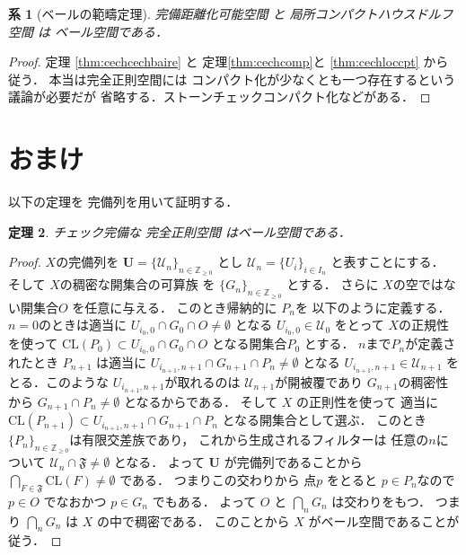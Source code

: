 \documentclass[leqno, a4paper, 12pt]{jsarticle}
\newtheorem{thm}{定理}
\newtheorem{cor}[thm]{系}
\newcommand{\zz}{\mathbb{Z}}
\newcommand{\cl}{\mathrm{CL}}
\begin{document}
\begin{cor}[ベールの範疇定理]
完備距離化可能空間
と
局所コンパクトハウスドルフ空間
は
ベール空間である．
\end{cor}
\begin{proof}
定理
\ref{thm:cechcechbaire}
と
定理\ref{thm:cechcomp}と
\ref{thm:cechloccpt}
から
従う．
本当は完全正則空間には
コンパクト化が少なくとも一つ存在するという議論が必要だが
省略する．ストーンチェックコンパクト化などがある．
\end{proof}


\section{おまけ}

以下の定理を
完備列を用いて証明する．
\begin{thm}
チェック完備な
完全正則空間
はベール空間である．
\end{thm}
\begin{proof}
$X$の完備列を
$\mathbf{U}=\{\mathcal{U}_{n}\}_{n\in \zz_{\ge 0}}$
とし
$\mathcal{U}_{n}=\{U_{i}\}_{i\in I_{n}}$
と表すことにする．
そして
$X$の稠密な開集合の可算族
を
$\{G_{n}\}_{n\in \zz_{\ge 0}}$
とする．
さらに
$X$の空ではない開集合$O$
を任意に与える．
このとき帰納的に
$P_{n}$を
以下のように定義する．
$n=0$のときは適当に
$U_{i_{0}, 0}\cap G_{0}\cap O\neq \emptyset$
となる
$U_{i_{0}, 0}\in \mathcal{U}_{0}$
をとって
$X$の正規性を使って
$\cl(P_{0})\subset U_{i_{0}, 0}\cap G_{0}\cap O$
となる開集合$P_{0}$
とする．
$n$まで$P_{n}$が定義されたとき
$P_{n+1}$
は適当に
$U_{i_{n+1}, n+1}\cap G_{n+1}\cap P_{n}\neq \emptyset$
となる
$U_{i_{n+1}, n+1}\in \mathcal{U}_{n+1}$
をとる．このような
$U_{i_{n+1}, n+1}$が取れるのは
$\mathcal{U}_{n+1}$が開被覆であり
$G_{n+1}$の稠密性から
$ G_{n+1}\cap P_{n}\neq \emptyset$
となるからである．
そして
$X$
の正則性を使って
適当に
$\cl(P_{n+1})\subset U_{i_{n+1}, n+1}\cap G_{n+1}\cap P_{n}$
となる開集合として選ぶ．
このとき$\{P_{n}\}_{n\in \zz_{\ge 0}}$は有限交差族であり，
これから生成されるフィルターは
任意の$n$について
$\mathcal{U}_{n}\cap \mathfrak{F}\neq \emptyset$
となる．
よって
$\mathbf{U}$
が完備列であることから
$\bigcap_{F\in \mathfrak{F}}\cl(F)\neq \emptyset$
である．
つまりこの交わりから
点$p$
をとると
$p\in P_{n}$なので
$p\in O$
でなおかつ
$p\in G_{n}$
でもある．
よって
$O$
と
$\bigcap_{n}G_{n}$
は交わりをもつ．
つまり
$\bigcap_{n}G_{n}$
は
$X$
の中で稠密である．
このことから
$X$
がベール空間であることが従う．
\end{proof}
\end{document}
